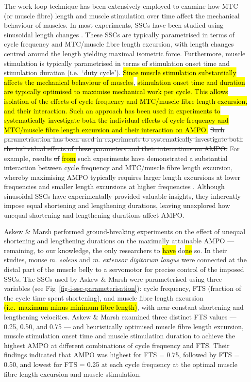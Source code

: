 \documentclass[
  10pt,
  letterpaper,
]{article}
\begin{document}
The work loop technique has been extensively employed to examine how MTC
(or muscle fibre) length and muscle stimulation over time affect the
mechanical behaviour of muscles. In most experiments, SSCs have been
studied using sinusoidal length changes
\citep[e.g.][]{josephson_mechanical_1985}. These SSCs are typically
parametrised in terms of cycle frequency and MTC/muscle fibre length
excursion, with length changes centred around the length yielding
maximal isometric force. Furthermore, muscle stimulation is typically
parametrised in terms of stimulation onset time and stimulation duration
(i.e.~`duty cycle'). \hl{Since muscle stimulation substantially affects
the mechanical behaviour of
muscles}\citep[e.g.][]{curtin_remarkable_2018, sawicki_timing_2015, stevens_pattern_1996},
\hl{stimulation onset time and duration are typically optimised to
maximise mechanical work per cycle. This allows isolation of the effects
of cycle frequency and MTC/muscle fibre length excursion, and their
interaction. Such an approach has been used in experiments to
systematically investigate both the individual effects of cycle
frequency and MTC/muscle fibre length excursion and their interaction on
AMPO.} \st{Such parametrisation has been used in experiments to
systematically investigate both the individual effects of these
parameters and their interactions on AMPO.} For example, results \st{of}
\hl{from} such experiments have demonstrated a substantial interaction
between cycle frequency and MTC/muscle fibre length excursion, whereby
maximising AMPO typically requires larger length excursions at lower
frequencies and smaller length excursions at higher frequencies
\citep[e.g.][]{altringham_modelling_1990, james_mechanical_1995, caiozzo_determinants_1997}.
Although sinusoidal SSCs have experimentally provided valuable insights,
they inherently impose equal shortening and lengthening durations,
leaving unexplored how unequal shortening and lengthening durations
affect AMPO.

Askew \& Marsh {\citep{askew_effects_1997, askew_optimal_1998}}
performed ground-breaking experiments on the effect of unequal
shortening and lengthening durations on the maximally attainable AMPO
--- remaining, to our knowledge, the only researchers to \hl{have}
do\hl{ne} so. In their studies, mouse \emph{m. soleus} and \emph{m.
extensor digitorum longus} were connected at the distal part of the
muscle belly to a servomotor for precise control of the imposed SSCs.
The SSCs used by Askew \& Marsh were parameterised using three variables
(see Fig~\ref{fig-i-ssc-parameterisation}): cycle frequency, FTS
(fraction of the cycle time spent shortening), and muscle fibre length
excursion \hl{(i.e.~maximum minus minimum fibre length)}, with
near-constant shortening and lengthening velocities. Askew \& Marsh
{\citep{askew_effects_1997, askew_optimal_1998}} examined three distinct
FTS values --- 0.25, 0.50, and 0.75 --- and heuristically optimised
muscle fibre length excursion, muscle stimulation onset time and muscle
stimulation duration to achieve the highest AMPO at different
combinations of cycle frequency and FTS. Their findings indicated that
AMPO was highest for FTS = 0.75, followed by FTS = 0.50, and lowest for
FTS = 0.25 at each cycle frequency at the optimal muscle fibre length
excursion and muscle stimulation.
\end{document}
